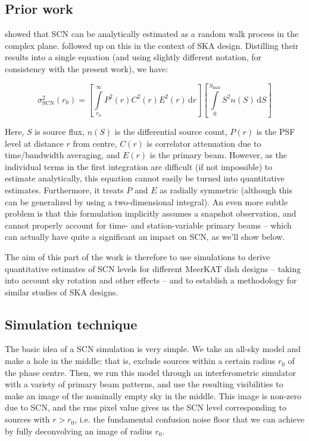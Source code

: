 \documentclass{aa}
\begin{document}
\subsection{Prior work}

\citet[][see Appendix B]{VLA146} showed that SCN can be analytically estimated as a random walk process in the complex plane. \citet[][]{SKA54-expa,SKA54} followed up on this in the context of SKA design. Distilling their results into a single equation (and using slightly different notation, for consistency with the present work), we have:

\newcommand{\DD}[1]{\,\mathrm{d}{#1}}

\begin{equation}
\label{eq:fscn}
  \sigma^2_\mathrm{SCN}(r_0) = \left [ \int\limits_{r_0}^{\infty} P^2(r)C^2(r)E^2(r) \DD{r} \right ]
\left[ \int\limits_{0}^{S_\mathrm{max}} S^2n(S)\DD{S}\right ] 
\end{equation}

Here, $S$ is source flux, $n(S)$ is the differential source count, $P(r)$ is the PSF level at distance $r$ from centre, $C(r)$ is correlator attenuation due to time/bandwidth averaging, and $E(r)$ is the primary beam. However, as the individual terms in the first integration are difficult (if not impossible) to estimate analytically, this equation cannot easily be turned into quantitative estimates. Furthermore, it treats $P$ and $E$ as radially symmetric (although this can be generalized by using a two-dimensional integral). An even more subtle problem is that this formulation implicitly assumes a snapshot observation, and cannot properly account for time- and station-variable primary beams -- which can actually have quite a significant an impact on SCN, as we'll show below.

The aim of this part of the work is therefore to use simulations to derive quantitative estimates of SCN levels for different MeerKAT dish designs -- taking into account sky rotation and other effects -- and to establish a methodology for similar studies of SKA designs.

\subsection{Simulation technique}

The basic idea of a SCN simulation is very simple. We take an all-sky model and make a hole in the middle: that is, exclude sources within a certain radius $r_0$ of the phase centre. Then, we run this model through an interferometric simulator with a variety of primary beam patterns, and use the resulting visibilities to make an image of the nominally empty sky in the middle. This image is non-zero due to SCN, and the rms pixel value gives us the SCN level corresponding to sources with $r>r_0$, i.e. the fundamental confusion noise floor that we can achieve by fully deconvolving an image of radius $r_0$.
\end{document}
